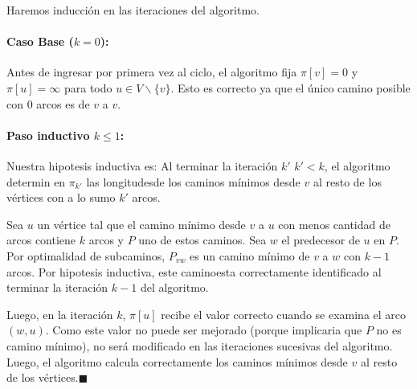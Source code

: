 \begin{demo}
  Haremos inducción en las iteraciones del algoritmo.

  \paragraph{Caso Base (\(k=0\)):} Antes de ingresar por primera vez al ciclo, el algoritmo fija \(\pi[v] = 0\) y \(\pi[u] = \infty\) para todo \(u\in V\backslash \{v\}\). Esto es correcto ya que el único camino posible con 0 arcos es de \(v\) a \(v\).

  \paragraph{Paso inductivo \(k \leq 1\):} Nuestra hipotesis inductiva es: Al terminar la iteración \(k'\) \( k' < k\), el algoritmo determin en \(\pi_{k'}\) las longitudesde los caminos mínimos desde \(v\) al resto de los vértices con a lo sumo \(k'\) arcos.

  Sea \(u\) un vértice tal que el camino mínimo desde \(v\) a \(u\) con menos cantidad de arcos contiene \(k\) arcos y \(P\) uno de estos caminos. Sea \(w\) el predecesor de \(u\) en \(P\). Por optimalidad de subcaminos, \(P_{vw}\) es un camino mínimo de \(v\) a \(w\) con \(k-1\) arcos. Por hipotesis inductiva, este caminoesta correctamente identificado al terminar la iteración \(k-1\) del algoritmo.

  Luego, en la iteración \(k\), \(\pi[u]\) recibe el valor correcto cuando se examina el arco \((w,u)\). Como este valor no puede ser mejorado (porque implicaria que \(P\) no es camino mínimo), no será modificado en las iteraciones sucesivas del algoritmo. Luego, el algoritmo calcula correctamente los caminos mínimos desde \(v\) al resto de los vértices.\hfill\(\blacksquare\)
\end{demo}
